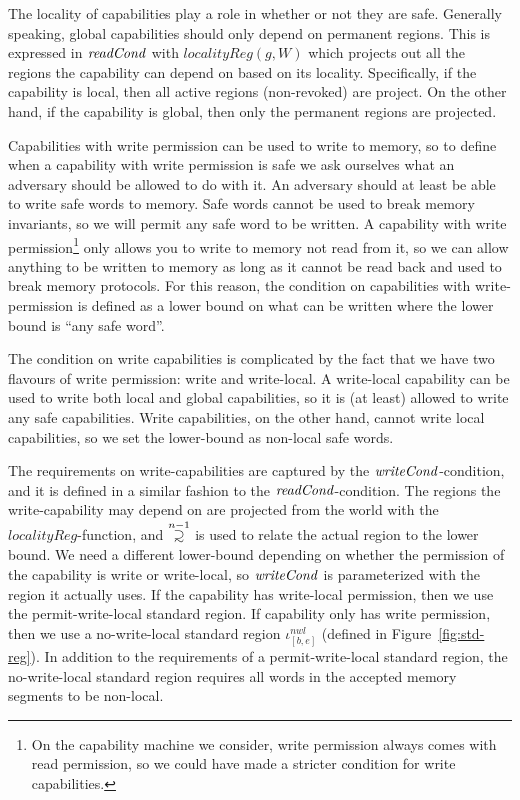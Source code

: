 \documentclass[format=acmsmall, review=true, screen=true]{acmart}
\renewcommand{\figurename}{Figure}
\newcommand\supsetsim{\mathrel{\ooalign{\raise.2ex\hbox{$\supset$}\cr
      \hidewidth\lower.8ex\hbox{\scalebox{0.9}{$\sim$}}\hidewidth\cr}}}
\newcommand{\nsupsim}[1][n]{\stackrel{\tiny{#1}}{\supsetsim}}
\newcommand{\var}[1]{\mathit{#1}}
\newcommand{\gl}{\var{g}}
\newcommand{\start}{\var{b}}
\newcommand{\addrend}{\var{e}}
\newcommand{\nwl}{\var{nwl}}
\newcommand{\plainfun}[2]{
  \ifthenelse{\equal{#2}{}}
  {\mathit{#1}}
  {\mathit{#1}(#2)}
}
\newcommand{\readCond}[1]{\plainfun{readCond}{#1}}
\newcommand{\writeCond}[1]{\plainfun{writeCond}{#1}}
\newcommand{\tpwl}{permit-write-local standard region}
\newcommand{\tnwl}{no-write-local standard region}
\begin{document}
The locality of capabilities play a role in whether or not they are safe.
Generally speaking, global capabilities should only depend on permanent regions.
This is expressed in $\readCond{}$ with $\var{localityReg}(\gl,W)$ which projects out all the regions the capability can depend on based on its locality.
Specifically, if the capability is local, then all active regions (non-revoked) are project.
On the other hand, if the capability is global, then only the permanent regions are projected.

Capabilities with write permission can be used to write to memory, so to define when a capability with write permission is safe we ask ourselves what an adversary should be allowed to do with it.
An adversary should at least be able to write safe words to memory.
Safe words cannot be used to break memory invariants, so we will permit any safe word to be written.
A capability with write permission\footnote{On the capability machine we consider, write permission always comes with read permission, so we could have made a stricter condition for write capabilities.}
only allows you to write to memory not read from it, so we can allow anything to be written to memory as long as it cannot be read back and used to break memory protocols.
For this reason, the condition on capabilities with write-permission is defined as a lower bound on what can be written where the lower bound is ``any safe word''.

The condition on write capabilities is complicated by the fact that we have two flavours of write permission: write and write-local.
A write-local capability can be used to write both local and global capabilities, so it is (at least) allowed to write any safe capabilities.
Write capabilities, on the other hand, cannot write local capabilities, so we set the lower-bound as non-local safe words.

The requirements on write-capabilities are captured by the $\writeCond{}$-condition, and it is defined in a similar fashion to the $\readCond{}$-condition.
The regions the write-capability may depend on are projected from the world with the $\var{localityReg}$-function, and $\nsupsim[n-1]$ is used to relate the actual region to the lower bound.
We need a different lower-bound depending on whether the permission of the capability is write or write-local, so $\writeCond{}$ is parameterized with the region it actually uses.
If the capability has write-local permission, then we use the \tpwl{}.
If capability only has write permission, then we use a \tnwl{} $\iota^\nwl_{[\start,\addrend]}$ (defined in \figurename~\ref{fig:std-reg}).
In addition to the requirements of a \tpwl, the \tnwl{} requires all words in the accepted memory segments to be non-local.
\end{document}
